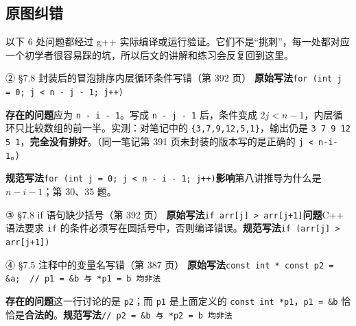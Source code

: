 \documentclass[UTF8,a4paper,11pt,fontset=none,zihao=-4]{ctexart}
\newcommand{\ci}[1]{{\circfont #1}}
\newcommand{\cpp}[1]{\lstinline[style=cpp,basicstyle=\ttfamily,numbers=none]{#1}}
\newcommand{\cc}[1]{\texttt{#1}}
\begin{document}
\subsection*{原图纠错}
以下 6 处问题都经过 g++ 实际编译或运行验证。它们不是“挑刺”，每一处都对应一个初学者很容易踩的坑，所以后文的讲解和练习会反复回到这里。


\begin{correctionbox}{\ci{②} §7.8 封装后的冒泡排序内层循环条件写错（第 392 页）}
\textbf{原始写法}\quad \cpp{for (int j = 0; j < n - j - 1; j++)}

\textbf{存在的问题}\quad 应为 \cpp{n - i - 1}。写成 \cc{n - j - 1} 后，条件变成 $2j<n-1$，内层循环只比较数组的前一半。实测：对笔记中的 \cc{\{3,7,9,12,5,1\}}，输出仍是 \cc{3 7 9 12 5 1}，\textbf{完全没有排好}。（同一笔记第 391 页未封装的版本写的是正确的 \cc{j < n-i-1}。）

\textbf{规范写法}\quad \cpp{for (int j = 0; j < n - i - 1; j++)}\qquad\textbf{影响}\quad 第八讲推导为什么是 $n-i-1$；第 30、35 题。
\end{correctionbox}

\begin{correctionbox}{\ci{③} §7.8 if 语句缺少括号（第 392 页）}
\textbf{原始写法}\quad \cpp{if arr[j] > arr[j+1]}\qquad \textbf{问题}\quad C++ 语法要求 \cc{if} 的条件必须写在圆括号中，否则编译错误。\qquad\textbf{规范写法}\quad \cpp{if (arr[j] > arr[j+1])}
\end{correctionbox}

\begin{correctionbox}{\ci{④} §7.5 注释中的变量名写错（第 387 页）}
\textbf{原始写法}\quad \cpp{const int * const p2 = &a;}\ \ \cpp{// p1 = &b 与 *p1 = b 均非法}

\textbf{存在的问题}\quad 这一行讨论的是 \cc{p2}；而 \cc{p1} 是上面定义的 \cc{const int *p1}，\cc{p1 = \&b} 恰恰是\textbf{合法的}。\quad\textbf{规范写法}\quad \cpp{// p2 = &b 与 *p2 = b 均非法}
\end{correctionbox}
\end{document}
